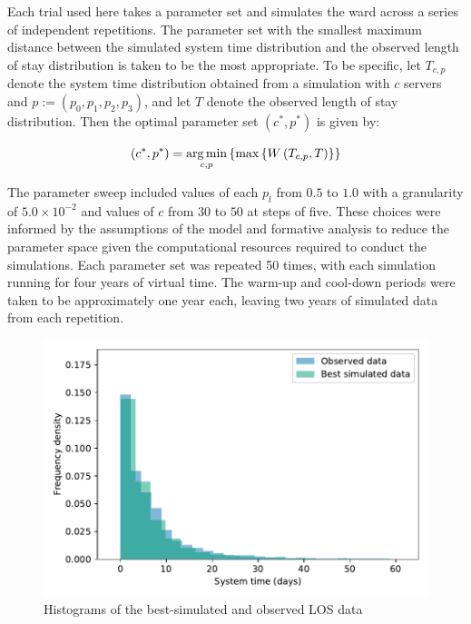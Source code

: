 Each trial used here takes a parameter set and simulates the ward across a
series of independent repetitions. The parameter set with the smallest maximum
distance between the simulated system time distribution and the observed length
of stay distribution is taken to be the most appropriate. To be specific, let
\(T_{c,p}\) denote the system time distribution obtained from a simulation with
\(c\) servers and \(p := \left(p_0,p_1,p_2,p_3\right)\), and let \(T\) denote
the observed length of stay distribution. Then the optimal parameter set
\(\left(c^*, p^*\right)\) is given by:

\begin{equation}\label{eq:parameters}
    \left(c^*, p^*\right) = \argmin_{c, p} \left\{%
        \max \left\{ W\left(T_{c,p}, T\right) \right\}%
    \right\}
\end{equation}

The parameter sweep included values of each \(p_l\) from \(0.5\) to \(1.0\) with
a granularity of \(5.0 \times 10^{-2}\) and values of \(c\) from \(30\) to
\(50\) at steps of five. These choices were informed by the assumptions of the
model and formative analysis to reduce the parameter space given the
computational resources required to conduct the simulations. Each parameter set
was repeated 50 times, with each simulation running for four years of virtual
time. The warm-up and cool-down periods were taken to be approximately one year
each, leaving two years of simulated data from each repetition.

\begin{figure}
    \centering
    \includegraphics[width=\imgwidth]{best_params}
    \caption{%
        Histograms of the best-simulated and observed LOS data
    }\label{fig:best_params}
\end{figure}

